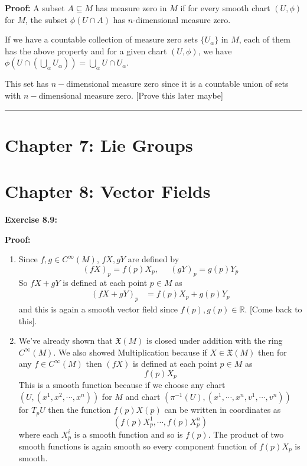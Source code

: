 \documentclass{article}
\newcommand{\R}{\mathbb R}
\begin{document}
\textbf{Proof:}
A subset $A \subseteq M$ has measure zero in $M$ if for every smooth chart $(U, \phi)$ for $M$, the subset $\phi(U \cap A)$ has $n$-dimensional measure zero.

\vskip 0.25cm
If we have a countable collection of measure zero sets $\{U_{\alpha}\}$ in $M$, each of them has the above property and for a given chart $(U, \phi)$, we have $\phi \left( U \cap \left(\bigcup_{\alpha} U_{\alpha}\right) \right) = \bigcup_{\alpha} U \cap U_{\alpha}$.

\vskip 0.25cm
This set has $n-$dimensional measure zero since it is a countable union of sets with $n-$dimensional measure zero. [Prove this later maybe]


\vskip 0.5cm
\hrule
\vskip 0.5cm

\pagebreak

\section{Chapter 7: Lie Groups}


\section{Chapter 8: Vector Fields}

\textbf{Exercise 8.9:} 
\vskip 0.5cm

\textbf{Proof:}
\begin{enumerate}[label=(\alph*)]
  \item Since $f,g \in C^{\infty}(M)$, $fX, gY$ are defined by 
  \[ \left(fX\right)_p = f(p)X_p,\;\;\;\;\;\left(gY\right)_p = g(p)Y_p \]
  So $fX + gY$ is defined at each point $p \in M$ as 
  \begin{align*}
    \left(fX + gY \right)_p &= f(p)X_p + g(p)Y_p
  \end{align*}
  and this is again a smooth vector field since $f(p), g(p) \in \R$. [Come back to this].

  \vskip 0.5cm
  \item We've already shown that $\mathfrak{X}(M)$ is closed under addition with the ring $C^{\infty}(M)$. We also showed Multiplication  because if $X \in \mathfrak{X}(M)$ then for any $f \in C^{\infty}(M)$ then $\left(fX\right)$ is defined at each point $p \in M$ as 
  \[ f(p)X_p \]
  This is a smooth function because if we choose any chart $\left(U, (x^1, x^2, \cdots, x^n)\right)$ for $M$ and chart $\left(\pi^{-1}(U), \left(x^1, \cdots, x^n, v^1, \cdots, v^n \right)\right)$ for $T_p U$ then the function $f(p)X(p)$ can be written in coordinates as 
  \[ \left(f(p)X^1_p, \cdots, f(p)X^n_p\right) \]
  where each $X^i_p$ is a smooth function and so is $f(p)$. The product of two smooth functions is again smooth so every component function of $f(p)X_p$ is smooth.
\end{enumerate}
\end{document}
